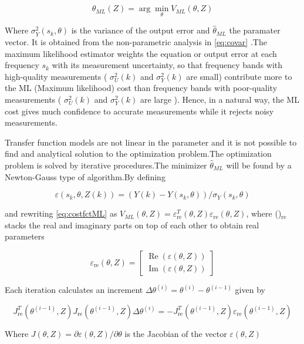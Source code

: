 \documentclass[a4paper,12pt]{report}
\numberwithin{equation}{section}
\begin{document}
\begin{equation}
\hat{\theta}_{ML}(Z)=\arg  \min _{\theta} V_{ML}(\theta, Z)
\end{equation}


\noindent
Where $\sigma_{Y}^{2}(s_{k}, \theta)$ is the variance of the output error and $\hat{\theta}_{ML}$ the paramater vector. It is obtained from the non-parametric analysis in \ref{eq:covar} .The maximum likelihood estimator weights the equation or output error at each frequency $s_{k}$ with its measurement uncertainty, so that frequency bands with high-quality
measurements ( $\sigma_{U}^{2}(k)$ and $\sigma_{Y}^{2}(k)$ are small) contribute more to the ML (Maximum likelihood) cost than frequency bands with poor-quality measurements ( $\sigma_{U}^{2}(k)$ and $\sigma_{Y}^{2}(k)$ are large ).  Hence, in a natural way, the ML cost gives much confidence to accurate measurements while it rejects noisy measurements.

Transfer function models are not linear in the parameter and it is not possible to find and analytical solution to the optimization problem.The optimization problem is solved by iterative procedures.The minimizer $\hat{\theta}_{ML}$ will be found by a Newton-Gauss type of algorithm.By defining 

$$
\varepsilon\left(s_{k}, \theta, Z(k)\right)=\left(Y(k)-Y\left(s_{k}, \theta\right)\right) / \sigma_{Y}\left(s_{k}, \theta\right)
$$

and rewriting \ref{eq:costfctML} as $V_{ML}(\theta, Z)=\varepsilon_{\mathrm{re}}^{T}(\theta, Z) \varepsilon_{\mathrm{re}}(\theta, Z)$, where ()$_{\mathrm{re}}$ stacks the real and imaginary
parts on top of each other to obtain real parameters

$$
\varepsilon_{\mathrm{re}}(\theta, Z)=\left[\begin{array}{l}
\operatorname{Re}(\varepsilon(\theta, Z)) \\
\operatorname{Im}(\varepsilon(\theta, Z))
\end{array}\right]
$$

Each iteration calculates an increment $\Delta \theta^{(i)}=\theta^{(i)}-\theta^{(i-1)}$ given by 

$$
J_{\mathrm{re}}^{T}\left(\theta^{(i-1)}, Z\right) J_{\mathrm{re}}\left(\theta^{(i-1)}, Z\right) \Delta \theta^{(i)}=-J_{\mathrm{re}}^{T}\left(\theta^{(i-1)}, Z\right) \varepsilon_{\mathrm{re}}\left(\theta^{(i-1)}, Z\right)
$$

Where $J(\theta, Z)=\partial \varepsilon(\theta, Z) / \partial \theta$ is the Jacobian of the vector $\varepsilon(\theta, Z)$
\end{document}

